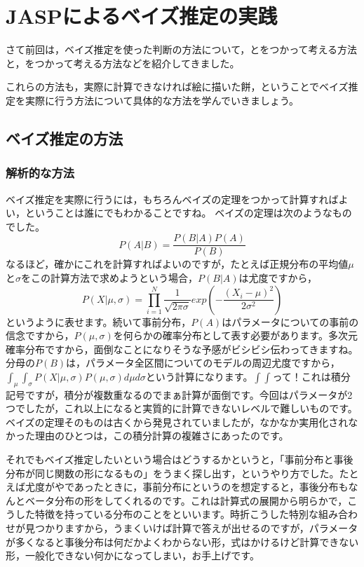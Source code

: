 \documentclass{ltjbook}
\begin{document}
\VerbatimFootnotes
\chapter{JASPによるベイズ推定の実践}
\label{chapter28}
さて前回は，ベイズ推定を使った判断の方法について，とをつかって考える方法と，をつかって考える方法などを紹介してきました。

これらの方法も，実際に計算できなければ絵に描いた餅，ということでベイズ推定を実際に行う方法について具体的な方法を学んでいきましょう。
\section{ベイズ推定の方法}
\subsection{解析的な方法}
ベイズ推定を実際に行うには，もちろんベイズの定理をつかって計算すればよい，ということは誰にでもわかることですね。
ベイズの定理は次のようなものでした。
\[ P(A|B) = \frac{P(B|A)P(A)}{P(B)} \]
なるほど，確かにこれを計算すればよいのですが，たとえば正規分布の平均値$\mu$と$\sigma$をこの計算方法で求めようという場合，$P(B|A)$は尤度ですから，
\[ P(X|\mu,\sigma) = \prod_{i=1}^N \frac{1}{\sqrt{2\pi \sigma}}exp\left( - \frac{(X_i-\mu)^2}{2\sigma^2}\right) \]
というように表せます。続いて事前分布，$P(A)$はパラメータについての事前の信念ですから，$P(\mu,\sigma)$を何らかの確率分布として表す必要があります。多次元確率分布ですから，面倒なことになりそうな予感がビシビシ伝わってきますね。
分母の$P(B)$は，パラメータ全区間についてのモデルの周辺尤度ですから，$\int_\mu \int_\sigma P(X|\mu,\sigma)P(\mu,\sigma) d\mu d\sigma$という計算になります。$\int \int$って！これは積分記号ですが，積分が複数重なるのでまぁ計算が面倒です。今回はパラメータが2つでしたが，これ以上になると実質的に計算できないレベルで難しいものです。ベイズの定理そのものは古くから発見されていましたが，なかなか実用化されなかった理由のひとつは，この積分計算の複雑さにあったのです。

それでもベイズ推定したいという場合はどうするかというと，「事前分布と事後分布が同じ関数の形になるもの」をうまく探し出す，というやり方でした。たとえば尤度がやであったときに，事前分布にというのを想定すると，事後分布もなんとベータ分布の形をしてくれるのです。これは計算式の展開から明らかで，こうした特徴を持っている分布のことをといいます。時折こうした特別な組み合わせが見つかりますから，うまくいけば計算で答えが出せるのですが，パラメータが多くなると事後分布は何だかよくわからない形，式はかけるけど計算できない形，一般化できない何かになってしまい，お手上げです。
\end{document}
